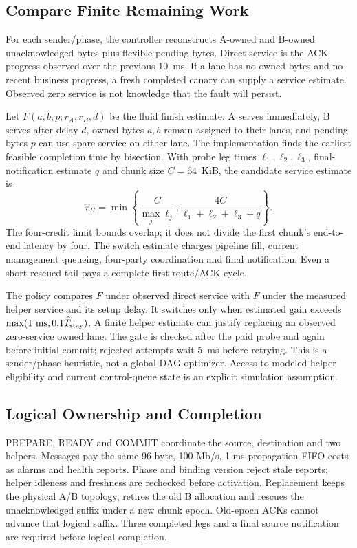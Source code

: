 \documentclass[sigconf]{acmart}
\begin{document}
\subsection{Compare Finite Remaining Work}
For each sender/phase, the controller reconstructs A-owned and B-owned
unacknowledged bytes plus flexible pending bytes. Direct service is the ACK
progress observed over the previous 10~ms. If a lane has no owned bytes and
no recent business progress, a fresh completed canary can supply a service
estimate. Observed zero service is not knowledge that the fault will persist.

Let $F(a,b,p;r_A,r_B,d)$ be the fluid finish estimate: A serves immediately,
B serves after delay $d$, owned bytes $a,b$ remain assigned to their lanes,
and pending bytes $p$ can use spare service on either lane. The implementation
finds the earliest feasible completion time by bisection. With probe leg
times $\ell_1,\ell_2,\ell_3$, final-notification estimate $q$ and chunk size
$C=64$~KiB, the candidate service estimate is
\[
\widehat r_H=\min\left\{\frac{C}{\max_j\ell_j},
\frac{4C}{\ell_1+\ell_2+\ell_3+q}\right\}.
\]
The four-credit limit bounds overlap; it does not divide the first chunk's
end-to-end latency by four. The switch estimate charges pipeline fill,
current management queueing, four-party coordination and final notification.
Even a short rescued tail pays a complete first route/ACK cycle.

The policy compares $F$ under observed direct service with $F$ under the
measured helper service and its setup delay. It switches only when estimated
gain exceeds $\max(1~\mathrm{ms},0.1\widehat T_{\rm stay})$. A finite helper
estimate can justify replacing an observed zero-service owned lane.
The gate is checked after the paid probe and again before initial commit;
rejected attempts wait 5~ms before retrying. This is a sender/phase heuristic,
not a global DAG optimizer. Access to modeled helper eligibility and current
control-queue state is an explicit simulation assumption.

\subsection{Logical Ownership and Completion}
PREPARE, READY and COMMIT coordinate the source, destination and two helpers.
Messages pay the same 96-byte, 100-Mb/s, 1-ms-propagation FIFO costs as alarms
and health reports. Phase and binding version reject stale reports; helper
idleness and freshness are rechecked before activation. Replacement keeps
the physical A/B topology, retires the old B allocation and rescues the
unacknowledged suffix under a new chunk epoch. Old-epoch ACKs cannot advance
that logical suffix. Three completed legs and a final source notification
are required before logical completion.
\end{document}
